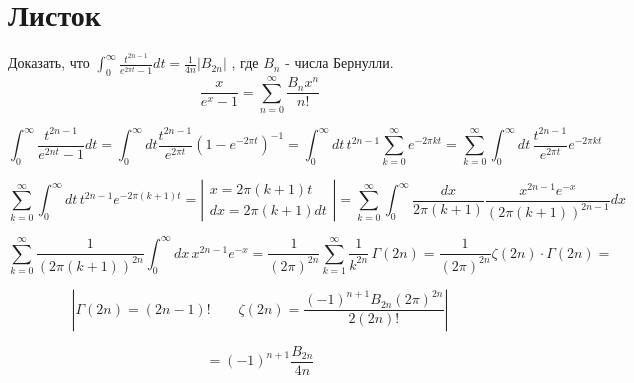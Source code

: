 \section{Листок}

\begin{exercise}
Доказать, что 	$\displaystyle\int_{0}^{\infty} \frac{t^{2 n-1}}{e^{2 \pi t}-1} d t=\frac{1}{4 n}\left| B_{2 n}\right| $ , где $B_{n}$ - числа Бернулли.
$$ \displaystyle \frac{x}{e^{x}-1}=\sum_{n=0}^{\infty} \frac{B_{n} x^{n}}{n !}$$

\end{exercise}
\begin{solution}
	$$
	\int_{0}^{\infty} \frac{t^{2 n-1}}{e^{2 n t}-1} d t=\int_{0}^{\infty} d t \frac{t^{2 n-1}}{e^{2 \pi t}}\left(1-e^{-2 \pi t}\right)^{-1} = \int_{0}^{\infty}  d t \hspace{2pt} t^{2 n-1} \sum_{k=0}^{\infty} e^{-2 \pi k t}=\sum_{k = 0}^{\infty} \int_{0}^{\infty} d t \hspace{2pt} \frac{t^{2 n-1}}{e^{2 \pi t}} e^{-2 \pi k t}
	$$
	
	$$
	\sum_{k=0}^{\infty} \int_{0}^{\infty} d t \hspace{2pt} t^{2 n-1} e^{-2 \pi(k+1) t} = \left|
	\begin{array}{l}{x=2 \pi(k+1) t} \\ {d x=2 \pi(k+1) d t}\end{array} \right|=\sum_{k=0}^{\infty} \int_{0}^{\infty} \frac{d x}{2 \pi(k+1)} \frac{x^{2 n-1} e^{-x}}{(2 \pi(k+1))^{2 n-1}} d x
	$$
	
	$$
	\sum_{k=0}^{\infty} \frac{1}{(2 \pi(k+1))^{2 n}} \int_{0}^{\infty} d x \hspace{2pt} x^{2 n-1} e^{-x} = \frac{1}{(2 \pi)^{2n}}\sum_{k=1}^{\infty} \frac{1}{k^{2 n}} \hspace{2pt} \Gamma(2 n) = \frac{1}{(2 \pi)^{2 n}} \zeta(2 n) \cdot \Gamma(2 n) = 
	$$
	
	$$
	\left|\Gamma(2n)=(2 n-1) ! \qquad \zeta(2 n)=\frac{(-1)^{n+1} B_{2 n}(2 \pi)^{2 n}}{2(2 n) !} \right|
	$$
	
	$$
	= (-1)^{n+1} \frac{B_{2 n}}{4 n}
	$$
	
\end{solution}


\begin{problem}

\end{problem}

